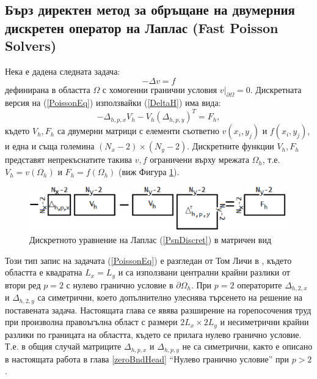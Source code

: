 \documentclass[a4paper]{article}
\newcommand{\be}{\begin{equation}}
\newcommand{\ee}{\end{equation}}
\newcommand{\rf}[1]{(\ref{#1})}
\theoremstyle{remark}
\begin{document}
\begin{large}
\subsection{Бърз директен метод за обръщане на двумерния дискретен оператор на Лаплас (Fast Poisson Solvers) }\label{FPS}
Нека е дадена следната задача:
\be\label{PoissonEq}
-\Delta v = f
\ee
дефинирана в областта $\Omega$ с хомогенни гранични условия $v \big|_{\partial\Omega} = 0$. Дискретната версия на \rf{PoissonEq} използвайки \rf{DeltaH} има вида:
\be\label{PsnDiscret}
-\Delta_{h,p,x}  V_h - V_h (\Delta_{h,p,y})^T = F_h,
\ee
където $V_h, F_h$ са двумерни матрици с елементи съответно $v(x_i,y_j)$ и  $f(x_i,y_j)$, и една и съща големина $(N_x-2)\times(N_y-2)$. Дискретните функции $V_h, F_h$ представят непрекъснатите такива $v, f$ ограничени върху мрежата $\Omega_h$, т.е. $V_h = v(\Omega_h)$ и $F_h = f(\Omega_h)$ (виж Фигура \ref{fig:FPSexplained}).
\begin{figure}[ht]
     \includegraphics[width=\linewidth]{FPSExplained.png}
	\caption{Дискретното уравнение на Лаплас \rf{PsnDiscret} в матричен вид}
	\label{fig:FPSexplained}
\end{figure}
\FloatBarrier
Този тип запис на задачата \rf{PoissonEq} е разгледан от Том Личи в \cite{ref34}, където областта е квадратна $L_x = L_y$ и са използвани централни крайни разлики от втори ред $p=2$ с нулево гранично условие в $\partial \Omega_h$. При $p=2$ операторите $\Delta_{h,2,x}$ и $\Delta_{h,2,y}$ са симетрични, което допълнително улеснява търсенето на решение на поставената задача. Настоящата глава се явява разширение на горепосочения труд при произволна правоъгълна област с размери $2L_x \times 2L_y$ и несиметрични крайни разлики по границата на областта, където се прилага нулево гранично условие. Т.е. в общия случай матриците $\Delta_{h,p,x}$ и $\Delta_{h,p,y}$ не са симетрични, както е описано в настоящата работа в глава \ref{zeroBndHead} ``Нулево гранично условие'' при $p>2$. 


\end{large}
\end{document}
